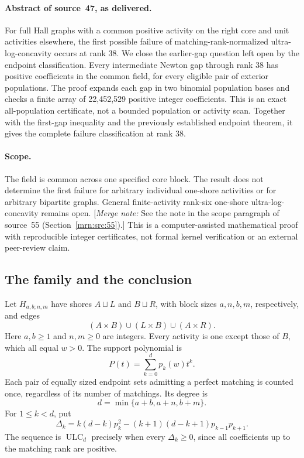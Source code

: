 \documentclass[11pt,a4paper]{article}
\theoremstyle{remark}\newtheorem{remark}[theorem]{Remark}
\newcommand{\ULC}{\operatorname{ULC}}      %
\newcommand{\mnote}[1]{[\textit{Merge note:} #1]}
\begin{document}
\paragraph{Abstract of source~47, as delivered.} For full Hall graphs with a common positive activity on the right core and unit activities elsewhere, the first possible failure of matching-rank-normalized ultra-log-concavity occurs at rank 38. We close the earlier-gap question left open by the endpoint classification. Every intermediate Newton gap through rank 38 has positive coefficients in the common field, for every eligible pair of exterior populations. The proof expands each gap in two binomial population bases and checks a finite array of 22,452,529 positive integer coefficients. This is an exact all-population certificate, not a bounded population or activity scan. Together with the first-gap inequality and the previously established endpoint theorem, it gives the complete failure classification at rank 38.

\paragraph{Scope.}
The field is common across one specified core block. The result does not determine the first failure for arbitrary individual one-shore activities or for arbitrary bipartite graphs. General finite-activity rank-six one-shore ultra-log-concavity remains open. \mnote{See the note in the scope paragraph of source~55 (Section~\ref{mrn:src:55}).} This is a computer-assisted mathematical proof with reproducible integer certificates, not formal kernel verification or an external peer-review claim.

\subsection{The family and the conclusion}
Let $H_{a,b;n,m}$ have shores $A\sqcup L$ and $B\sqcup R$, with block sizes $a,n,b,m$, respectively, and edges
\[
 (A\times B)\cup(L\times B)\cup(A\times R).
\]
Here $a,b\ge1$ and $n,m\ge0$ are integers. Every activity is one except those of $B$, which all equal $w>0$. The support polynomial is
\[
 P(t)=\sum_{k=0}^{d}p_k(w)t^k.
\]
Each pair of equally sized endpoint sets admitting a perfect matching is counted once, regardless of its number of matchings. Its degree is
\[
 d=\min\{a+b,a+n,b+m\}.
\]
For $1\le k<d$, put
\[
 \Delta_k=k(d-k)p_k^2-(k+1)(d-k+1)p_{k-1}p_{k+1}.
\]
The sequence is $\ULC_d$ precisely when every $\Delta_k\ge0$, since all coefficients up to the matching rank are positive.
\end{document}

